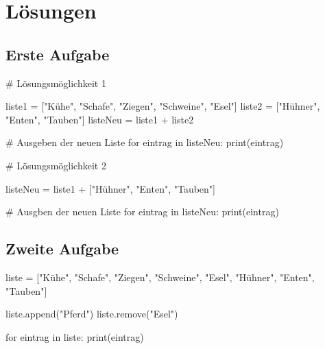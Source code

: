 \documentclass{\VorlagenPfad/coderdojokatext}
\begin{document}
\section{Lösungen}

\subsection{Erste Aufgabe}
\begin{pythoncode}
	
# Lösungsmöglichkeit 1

liste1 = ["Kühe", "Schafe", "Ziegen", "Schweine", "Esel"] 
liste2 = ["Hühner", "Enten", "Tauben"]
listeNeu = liste1 + liste2

# Ausgeben der neuen Liste
for eintrag in listeNeu:	
	print(eintrag)


# Lösungsmöglichkeit 2

listeNeu = liste1 + ["Hühner", "Enten", "Tauben"]

# Ausgben der neuen Liste
for eintrag in listeNeu:	
	print(eintrag)
	
\end{pythoncode}

\subsection{Zweite Aufgabe}
\begin{pythoncode}

liste = ["Kühe", "Schafe", "Ziegen", "Schweine", "Esel",
 "Hühner", "Enten", "Tauben"]
 
liste.append("Pferd")
liste.remove("Esel")

for eintrag in liste:	
	print(eintrag)

\end{pythoncode}
\end{document}
